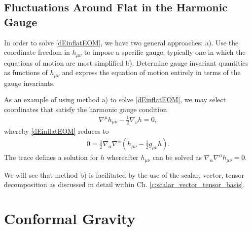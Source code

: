 \subsection{Fluctuations Around Flat in the Harmonic Gauge}
\label{ss:fluctuations_around_flat_in_the_harmonic_gauge}

In order to solve \eqref{dEinflatEOM}, we have two general approaches: a). Use the coordinate freedom in $h_{\mu\nu}$ to impose a specific gauge, typically one in which the equations of motion are most simplified
b). Determine gauge invariant quantities as functions of $h_{\mu\nu}$ and express the equation of motion entirely in terms of the gauge invariants. 

As an example of using method a) to solve \eqref{dEinflatEOM}, we may select coordinates that satisfy the harmonic gauge condition \cite{weinberg_1972}
\begin{eqnarray}
\nabla^\mu h_{\mu\nu} - \tfrac{1}{2}\nabla_\nu h = 0,
\end{eqnarray} 
whereby \eqref{dEinflatEOM} reduces to 
\begin{eqnarray}
0= \tfrac{1}{2} \nabla_{\alpha }\nabla^{\alpha } \left(h_{\mu\nu} - \tfrac{1}{2} g_{\mu\nu} h\right).
\end{eqnarray}
The trace defines a solution for $h$ whereafter $h_{\mu\nu}$ can be solved as $\nabla_\alpha\nabla^\alpha h_{\mu\nu} = 0$. 

We will see that method b) is facilitated by the use of the scalar, vector, tensor decomposition as discussed in detail within Ch. \ref{c:scalar_vector_tensor_basis}.

\section{Conformal Gravity}
\label{s:conformal_gravity}

